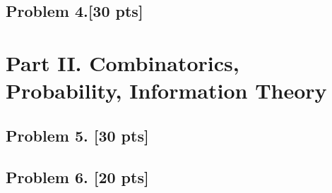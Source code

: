 \documentclass{article}
\begin{document}
\subsection{Problem 4.[30 pts]}





\section{Part II. Combinatorics, Probability, Information Theory}

\subsection{Problem 5. [30 pts]}

\subsection{Problem 6. [20 pts]}
\end{document}
